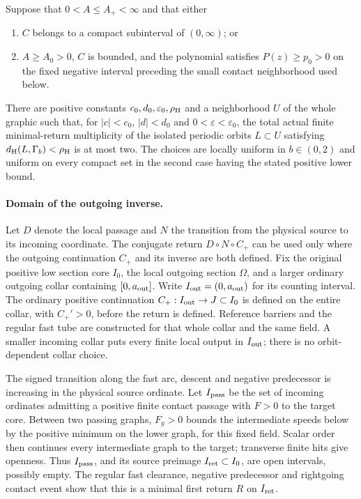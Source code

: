 \begin{proposition}\label{prop:simple-contact}
Suppose that $0<A\le A_+<\infty$ and that either
\begin{enumerate}
\item $C$ belongs to a compact subinterval of $(0,\infty)$; or
\item $A\ge A_0>0$, $C$ is bounded, and the polynomial satisfies
$P(z)\ge p_0>0$ on the fixed negative interval preceding the small
contact neighborhood used below.
\end{enumerate}
There are positive constants $c_0,d_0,\varepsilon_0,\rho_{\rm H}$
and a neighborhood $U$ of the whole graphic such that, for
$|c|<c_0$, $|d|<d_0$ and $0<\varepsilon<\varepsilon_0$,
the total actual finite minimal-return multiplicity of the isolated
periodic orbits $L\subset U$ satisfying
$d_{\rm H}(L,\Gamma_b)<\rho_{\rm H}$ is at most two.
The choices are locally uniform in
$b\in(0,2)$ and uniform on every compact set in the second case having
the stated positive lower bound.
\end{proposition}

\paragraph{Domain of the outgoing inverse.}
Let $D$ denote the local passage and $N$ the transition from the physical
source to its incoming coordinate. The conjugate return $D\circ N\circ C_+$
can be used only where the outgoing continuation $C_+$ and its inverse
are both defined.
Fix the original positive low section core $I_0$, the local outgoing
section $\Omega$, and a larger ordinary outgoing collar containing
$[0,a_{\rm out}]$. Write $I_{\rm out}=(0,a_{\rm out})$ for its counting interval.
The ordinary positive continuation $C_+:I_{\rm out}\to J\subset I_0$ is defined
on the entire collar, with $C_+'>0$, before the return is defined.
Reference barriers and the regular fast tube are constructed for that
whole collar and the same field. A smaller incoming collar puts every
finite local output in $I_{\rm out}$; there is no orbit-dependent collar choice.

The signed transition along the fast arc, descent and negative predecessor
is increasing in the physical source ordinate. Let $I_{\rm pass}$ be the
set of incoming ordinates admitting a positive finite contact passage
with $F>0$ to the target core. Between two passing
graphs, $F_y>0$ bounds the intermediate speeds below by the positive
minimum on the lower graph, for this fixed field. Scalar order then
continues every intermediate graph to the target; transverse finite
hits give openness. Thus $I_{\rm pass}$, and its source preimage
$I_{\rm ret}\subset I_0$, are open intervals, possibly empty.
The regular fast clearance, negative
predecessor and rightgoing contact event show that this is a minimal
first return $R$ on $I_{\rm ret}$.

